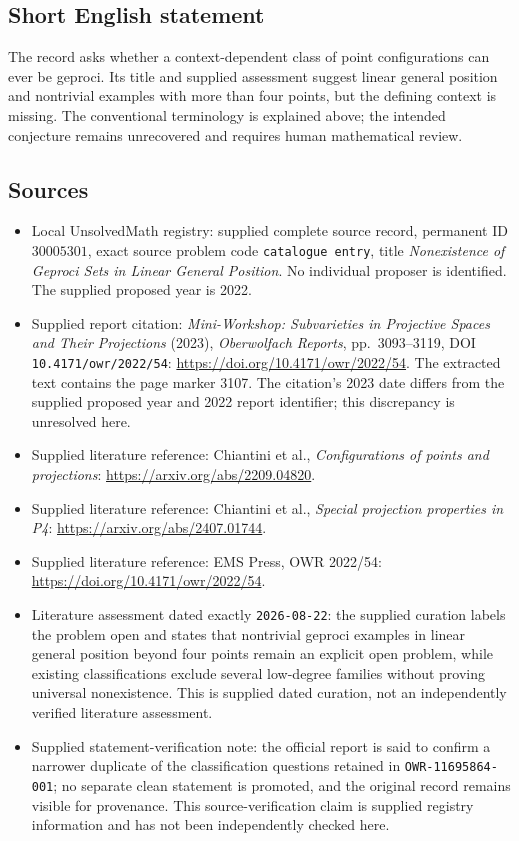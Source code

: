 \documentclass[11pt]{article}
\begin{document}
\subsection{Short English statement}
The record asks whether a context-dependent class of point configurations can ever be geproci. Its title and supplied assessment suggest linear general position and nontrivial examples with more than four points, but the defining context is missing. The conventional terminology is explained above; the intended conjecture remains unrecovered and requires human mathematical review.
\subsection{Sources}
\begin{itemize}
\item Local UnsolvedMath registry: supplied complete source record, permanent ID \(30005301\), exact source problem code \texttt{catalogue entry}, title \emph{Nonexistence of Geproci Sets in Linear General Position}. No individual proposer is identified. The supplied proposed year is 2022.
\item Supplied report citation: \emph{Mini-Workshop: Subvarieties in Projective Spaces and Their Projections} (2023), \emph{Oberwolfach Reports}, pp.~3093--3119, DOI \texttt{10.4171/owr/2022/54}: \url{https://doi.org/10.4171/owr/2022/54}. The extracted text contains the page marker 3107. The citation's 2023 date differs from the supplied proposed year and 2022 report identifier; this discrepancy is unresolved here.
\item Supplied literature reference: Chiantini et al., \emph{Configurations of points and projections}: \url{https://arxiv.org/abs/2209.04820}.
\item Supplied literature reference: Chiantini et al., \emph{Special projection properties in P4}: \url{https://arxiv.org/abs/2407.01744}.
\item Supplied literature reference: EMS Press, OWR 2022/54: \url{https://doi.org/10.4171/owr/2022/54}.
\item Literature assessment dated exactly \texttt{2026-08-22}: the supplied curation labels the problem open and states that nontrivial geproci examples in linear general position beyond four points remain an explicit open problem, while existing classifications exclude several low-degree families without proving universal nonexistence. This is supplied dated curation, not an independently verified literature assessment.
\item Supplied statement-verification note: the official report is said to confirm a narrower duplicate of the classification questions retained in \texttt{OWR-11695864-001}; no separate clean statement is promoted, and the original record remains visible for provenance. This source-verification claim is supplied registry information and has not been independently checked here.
\end{itemize}
\end{document}

